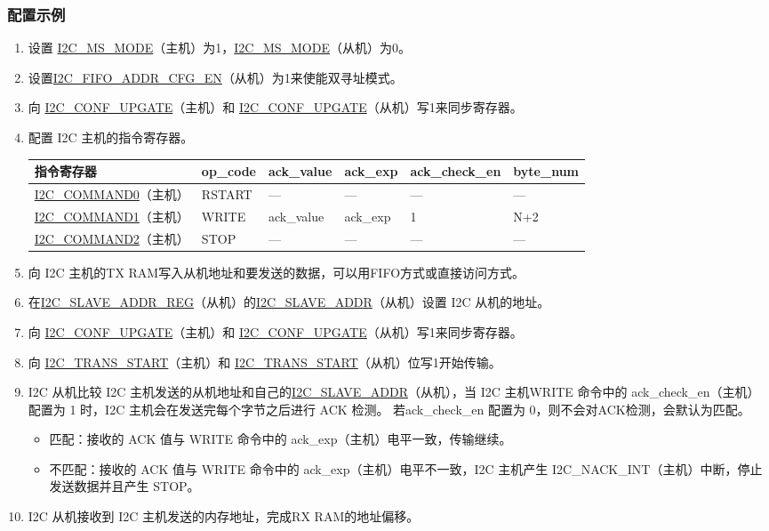 \documentclass[main\_\_CN.tex]{subfiles}
\begin{document}
\subsubsection{配置示例}
\begin{enumerate}
\item 设置 \hyperref[fielddesc:I2CMSMODE]{I2C\_MS\_MODE}（主机）为1，\hyperref[fielddesc:I2CMSMODE]{I2C\_MS\_MODE}（从机）为0。
\item 设置\hyperref[fielddesc:I2CFIFOADDRCFGEN]{I2C\_FIFO\_ADDR\_CFG\_EN}（从机）为1来使能双寻址模式。
\item 向 \hyperref[fielddesc:I2CCONFUPGATE]{I2C\_CONF\_UPGATE}（主机）和 \hyperref[fielddesc:I2CCONFUPGATE]{I2C\_CONF\_UPGATE}（从机）写1来同步寄存器。
\item 配置 I2C 主机的指令寄存器。
\begin{longtable}{ | p{4cm} | p{2cm} | p{2cm} | p{2cm} |p{2cm} | p{2cm} |}
\hline\rowcolor{lightgray}
指令寄存器& op\_code & ack\_value&ack\_exp&ack\_check\_en&byte\_num  \\ \hline
\hyperref[fielddesc:I2CCOMMAND0]{I2C\_COMMAND0}（主机）& RSTART& ---&---&---&---  \\ \hline
\hyperref[fielddesc:I2CCOMMAND1]{I2C\_COMMAND1}（主机）& WRITE& ack\_value&ack\_exp&1&N+2  \\ \hline
\hyperref[fielddesc:I2CCOMMAND2]{I2C\_COMMAND2}（主机）& STOP& ---&---&---&---  \\ \hline
\end{longtable}
\item 向 I2C 主机的TX RAM写入从机地址和要发送的数据，可以用FIFO方式或直接访问方式。
\item 在\hyperref[regdesc:I2CSLAVEADDRREG]{I2C\_SLAVE\_ADDR\_REG}（从机）的\hyperref[fielddesc:I2CSLAVEADDR]{I2C\_SLAVE\_ADDR}（从机）设置 I2C 从机的地址。
\item 向 \hyperref[fielddesc:I2CCONFUPGATE]{I2C\_CONF\_UPGATE}（主机）和 \hyperref[fielddesc:I2CCONFUPGATE]{I2C\_CONF\_UPGATE}（从机）写1来同步寄存器。
\item 向 \hyperref[fielddesc:I2CTRANSSTART]{I2C\_TRANS\_START}（主机）和 \hyperref[fielddesc:I2CTRANSSTART]{I2C\_TRANS\_START}（从机）位写1开始传输。
\item I2C 从机比较 I2C 主机发送的从机地址和自己的\hyperref[fielddesc:I2CSLAVEADDR]{I2C\_SLAVE\_ADDR}（从机），当 I2C 主机WRITE 命令中的 ack\_check\_en（主机）配置为 1 时，I2C 主机会在发送完每个字节之后进行 ACK 检测。 若ack\_check\_en 配置为 0，则不会对ACK检测，会默认为匹配。
\begin{itemize}
\item 匹配：接收的 ACK 值与 WRITE 命令中的 ack\_exp（主机）电平一致，传输继续。
\item 不匹配：接收的 ACK 值与 WRITE 命令中的 ack\_exp（主机）电平不一致，I2C 主机产生 I2C\_NACK\_INT（主机）中断，停止发送数据并且产生 STOP。
\end{itemize}
\item I2C 从机接收到 I2C 主机发送的内存地址，完成RX RAM的地址偏移。


\end{enumerate}
\end{document}
